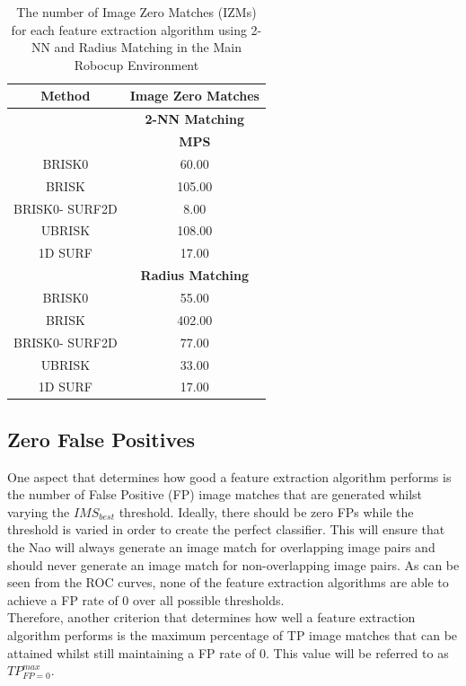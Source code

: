 \begin{table}
\centering
\caption{The number of Image Zero Matches (IZMs) for each feature extraction
algorithm using 2-NN and Radius Matching in the Main Robocup Environment}
\begin{tabular}{|c|c|}
\hline 
\textbf{Method} & \multicolumn{1}{c|}{\textbf{Image Zero Matches}}\tabularnewline
\hline 
 & \multicolumn{1}{c|}{\textbf{2-NN Matching}}\tabularnewline
\hline 
 & \textbf{MPS}\tabularnewline
\hline 
\hline 
BRISK0 & 60.00\tabularnewline
\hline 
BRISK & 105.00\tabularnewline
\hline 
BRISK0- SURF2D & 8.00\tabularnewline
\hline 
UBRISK & 108.00\tabularnewline
\hline 
1D SURF & 17.00\tabularnewline
\hline 
 & \multicolumn{1}{c|}{\textbf{Radius Matching}}\tabularnewline
\hline 
BRISK0 & 55.00\tabularnewline
\hline 
BRISK & 402.00\tabularnewline
\hline 
BRISK0- SURF2D & 77.00\tabularnewline
\hline 
UBRISK & 33.00\tabularnewline
\hline 
1D SURF & 17.00\tabularnewline
\hline 
\end{tabular}
\label{tab:mrd_izm}
\end{table}

\subsection{Zero False Positives}
\label{sec:zfp}
One aspect that determines how good a feature extraction algorithm performs is the number of False Positive (FP) image matches that are generated whilst varying the $IMS_{best}$ threshold. Ideally, there should be zero FPs while the threshold is varied in order to create the perfect classifier. This will ensure that the Nao will always generate an image match for overlapping image pairs and should never generate an image match for non-overlapping image pairs. As can be seen from the ROC curves, none of the feature extraction algorithms are able to achieve a FP rate of $0$ over all possible thresholds.\\

Therefore, another criterion that determines how well a feature extraction algorithm performs is the maximum percentage of TP image matches that can be attained whilst still maintaining a FP rate of $0$. This value will be referred to as $TP_{FP=0}^{max}$.  \\

